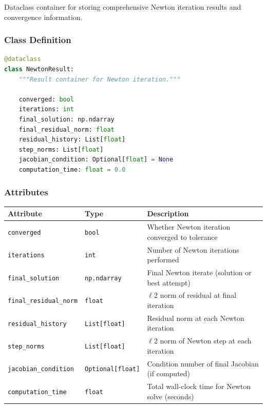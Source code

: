 Dataclass container for storing comprehensive Newton iteration results and convergence information.

\subsubsection{Class Definition}

\begin{lstlisting}[language=Python, caption=NewtonResult Class Definition]
@dataclass
class NewtonResult:
    """Result container for Newton iteration."""
    
    converged: bool
    iterations: int
    final_solution: np.ndarray
    final_residual_norm: float
    residual_history: List[float]
    step_norms: List[float]
    jacobian_condition: Optional[float] = None
    computation_time: float = 0.0
\end{lstlisting}

\subsubsection{Attributes}

\begin{longtable}{|p{4.5cm}|p{3cm}|p{6.5cm}|}
\hline
\textbf{Attribute} & \textbf{Type} & \textbf{Description} \\
\hline
\endhead

\texttt{converged} & \texttt{bool} & Whether Newton iteration converged to tolerance \\
\hline

\texttt{iterations} & \texttt{int} & Number of Newton iterations performed \\
\hline

\texttt{final\_solution} & \texttt{np.ndarray} & Final Newton iterate (solution or best attempt) \\
\hline

\texttt{final\_residual\_norm} & \texttt{float} & $\ell$2 norm of residual at final iteration \\
\hline

\texttt{residual\_history} & \texttt{List[float]} & Residual norm at each Newton iteration \\
\hline

\texttt{step\_norms} & \texttt{List[float]} & $\ell$2 norm of Newton step at each iteration \\
\hline

\texttt{jacobian\_condition} & \texttt{Optional[float]} & Condition number of final Jacobian (if computed) \\
\hline

\texttt{computation\_time} & \texttt{float} & Total wall-clock time for Newton solve (seconds) \\
\hline

\end{longtable}

